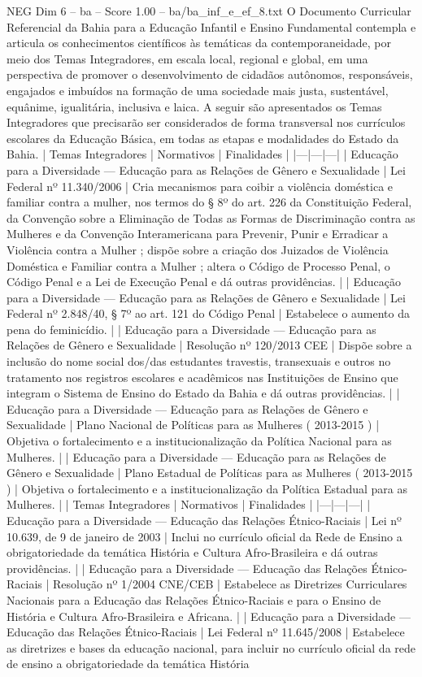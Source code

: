 \begin{textsample}{NEG Dim 6 – ba – Score 1.00 – ba/ba\_inf\_e\_ef\_8.txt}  \label{ex:f6_neg_213}
O Documento Curricular Referencial da Bahia para a Educação Infantil e Ensino Fundamental contempla e articula os conhecimentos científicos às temáticas da contemporaneidade, por meio dos Temas Integradores, em escala local, regional e global, em uma perspectiva de promover o desenvolvimento de cidadãos autônomos, responsáveis, engajados e imbuídos na formação de uma sociedade mais justa, sustentável, equânime, igualitária, inclusiva e laica.
A seguir são apresentados os Temas Integradores que precisarão ser considerados de forma transversal nos currículos escolares da Educação Básica, em todas as etapas e modalidades do Estado da Bahia. | Temas Integradores | Normativos | Finalidades | |---|---|---| | Educação para a Diversidade — Educação para as Relações de Gênero e Sexualidade | Lei Federal nº 11.340/2006 | Cria mecanismos para coibir a violência doméstica e familiar contra a mulher, nos termos do § 8º do art. 226 da Constituição Federal, da Convenção sobre a Eliminação de Todas as Formas de Discriminação contra as Mulheres e da Convenção Interamericana para Prevenir, Punir e Erradicar a Violência contra a Mulher ; dispõe sobre a criação dos Juizados de Violência Doméstica e Familiar contra a Mulher ; altera o Código de Processo Penal, o Código Penal e a Lei de Execução Penal e dá outras providências. | | Educação para a Diversidade — Educação para as Relações de Gênero e Sexualidade | Lei Federal nº 2.848/40, § 7º ao art. 121 do Código Penal | Estabelece o aumento da pena do feminicídio. | | Educação para a Diversidade — Educação para as Relações de Gênero e Sexualidade | Resolução nº 120/2013 CEE | Dispõe sobre a inclusão do nome social dos/das estudantes travestis, transexuais e outros no tratamento nos registros escolares e acadêmicos nas Instituições de Ensino que integram o Sistema de Ensino do Estado da Bahia e dá outras providências. | | Educação para a Diversidade — Educação para as Relações de Gênero e Sexualidade | Plano Nacional de Políticas para as Mulheres ( 2013-2015 ) | Objetiva o fortalecimento e a institucionalização da Política Nacional para as Mulheres. | | Educação para a Diversidade — Educação para as Relações de Gênero e Sexualidade | Plano Estadual de Políticas para as Mulheres ( 2013-2015 ) | Objetiva o fortalecimento e a institucionalização da Política Estadual para as Mulheres. | | Temas Integradores | Normativos | Finalidades | |---|---|---| | Educação para a Diversidade — Educação das Relações Étnico-Raciais | Lei nº 10.639, de 9 de janeiro de 2003 | Inclui no currículo oficial da Rede de Ensino a obrigatoriedade da temática História e Cultura Afro-Brasileira e dá outras providências. | | Educação para a Diversidade — Educação das Relações Étnico-Raciais | Resolução nº 1/2004 CNE/CEB | Estabelece as Diretrizes Curriculares Nacionais para a Educação das Relações Étnico-Raciais e para o Ensino de História e Cultura Afro-Brasileira e Africana. | | Educação para a Diversidade — Educação das Relações Étnico-Raciais | Lei Federal nº 11.645/2008 | Estabelece as diretrizes e bases da educação nacional, para incluir no currículo oficial da rede de ensino a obrigatoriedade da temática História 
\end{textsample}

